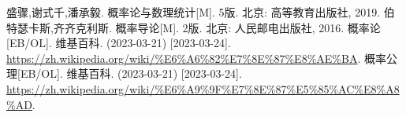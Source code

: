 \begin{thebibliography}{99}%
     盛骤,谢式千,潘承毅. 概率论与数理统计[M]. 5版. 北京: 高等教育出版社, 2019.
     伯特瑟卡斯,齐齐克利斯. 概率导论[M]. 2版. 北京: 人民邮电出版社, 2016.
     概率论[EB/OL]. 维基百科. (2023-03-21) [2023-03-24]. \\\url{https://zh.wikipedia.org/wiki/%E6%A6%82%E7%8E%87%E8%AE%BA}.
     概率公理[EB/OL]. 维基百科. (2023-03-21) [2023-03-24]. \\\url{https://zh.wikipedia.org/wiki/%E6%A9%9F%E7%8E%87%E5%85%AC%E8%A8%AD}.
\end{thebibliography}
